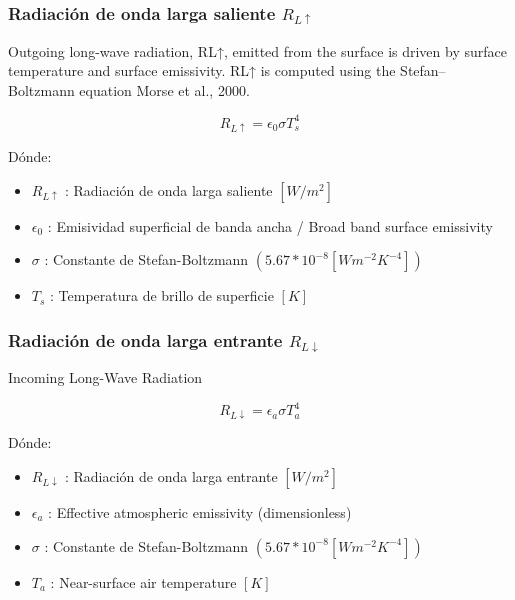 \vspace{0.4cm}
  
\subsubsection{Radiación de onda larga saliente $R_{L\uparrow}$}

Outgoing long-wave radiation, RL↑, emitted from the surface is
driven by surface temperature and surface emissivity. RL↑ is computed using the Stefan–Boltzmann equation Morse et al., 2000.

$$
R_{L\uparrow} = \epsilon_0  \sigma  T_{s}^{4}
$$

Dónde:
\begin{itemize}
    \item $R_{L\uparrow}$ : Radiación de onda larga saliente $[W/m^2]$
    \item $\epsilon_0$ : Emisividad superficial de banda ancha / Broad band surface emissivity
    \item $\sigma$ : Constante de Stefan-Boltzmann $(5.67*10^{-8}[W m^{-2}K^{-4}])$
    \item $T_s$ : Temperatura de brillo de superficie $[K]$
\end{itemize}

\vspace{0.4cm}

\subsubsection{Radiación de onda larga entrante $R_{L\downarrow}$}

Incoming Long-Wave Radiation

\begin{equation}
R_{L\downarrow} = \epsilon_a  \sigma  T_{a}^{4}
\label{eq:1}
\end{equation}

Dónde:
\begin{itemize}
    \item $R_{L\downarrow}$ : Radiación de onda larga entrante $[W/m^2]$
    \item $\epsilon_a$ : Effective atmospheric emissivity (dimensionless)
    \item $\sigma$ : Constante de Stefan-Boltzmann $(5.67*10^{-8}[W m^{-2}K^{-4}])$
    \item $T_a$ : Near-surface air temperature $[K]$
\end{itemize}
  
